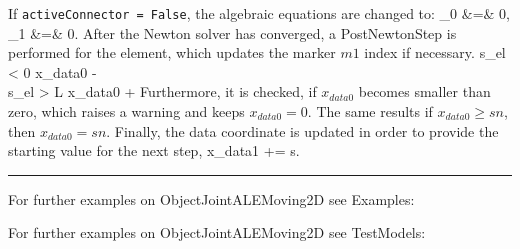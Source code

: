     \noindent If \texttt{activeConnector = False}, the algebraic equations are changed to:
    \bea
      \lambda_0 &=& 0,   \\
      \lambda_1 &=& 0.
    \eea   
%
    After the Newton solver has converged, a PostNewtonStep is performed for the element, which
    updates the marker $m1$ index if necessary.
    \bea
      s_{el} < 0 \quad \ra \quad x_{data0} \;-\! \nonumber\\
      s_{el} > L \quad \ra \quad x_{data0} \;+\!
    \eea
    Furthermore, it is checked, if $x_{data0}$ becomes smaller than zero, which raises a warning and keeps $x_{data0}=0$.
    The same results if $x_{data0}\ge sn$, then $x_{data0} = sn$.
    Finally, the data coordinate is updated in order to provide the starting value for the next step,
    \be
      x_{data1} \;+\!\!= s.
    \ee
%
\vspace{6pt}\par\noindent\rule{\textwidth}{0.4pt}
%
\noindent For further examples on ObjectJointALEMoving2D see Examples:
\bi
\item{}\ei

%
%
\noindent For further examples on ObjectJointALEMoving2D see TestModels:
\bi
\item{}\ei

%

\newpage

